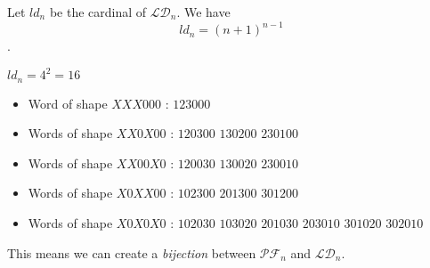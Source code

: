 \begin{theorem}
    Let $ld_n$ be the cardinal of $\mathcal{LD}_n$.
    We have $$ld_n = (n + 1)^{n - 1}$$.
\end{theorem}

\begin{example}[$n = 3$]
    $ld_n = 4^2 = 16$
    \begin{itemize}
        \item Word of shape $XXX000$ :
            \subitem $123000$
        \item Words of shape $XX0X00$ :
            \subitem $120300$
            \hspace{2cm} $130200$
            \hspace{2cm} $230100$
        \item Words of shape $XX00X0$ :
            \subitem $120030$
            \hspace{2cm} $130020$
            \hspace{2cm} $230010$
        \item Words of shape $X0XX00$ :
            \subitem $102300$
            \hspace{2cm} $201300$
            \hspace{2cm} $301200$
        \item Words of shape $X0X0X0$ :
            \subitem $102030$
            \hspace{2cm} $103020$
            \hspace{2cm} $201030$
            \subitem $203010$
            \hspace{2cm} $301020$
            \hspace{2cm} $302010$
    \end{itemize}
    
\end{example}

\begin{prop}
    This means we can create a \emph{bijection} between
    $\mathcal{PF}_n$ and $\mathcal{LD}_n$.
\end{prop}

